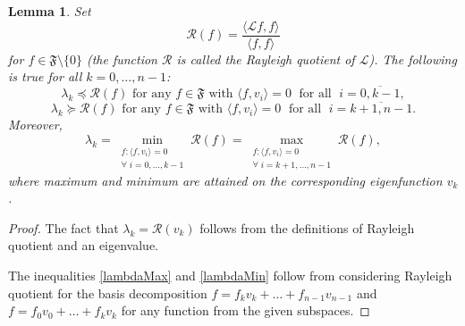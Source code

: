 \documentclass[a4paper,12pt]{amsart}
\newtheorem{lemma}{Lemma}
\theoremstyle{definition}
\begin{document}
\begin{lemma}\label{Rq}
Set 
\begin{equation*}
\mathcal R(f)=\dfrac{\langle\mathcal L f,f\rangle}{\langle f,f\rangle}
\end{equation*}
for $f\in \mathfrak F\setminus\{0\}$ (the function $\mathcal R$ is called the \emph{Rayleigh quotient} of $\mathcal L$). The following is true for all $k=0,\dots,n-1$:
\begin{equation}\label{lambdaMax}
\lambda_k\preceq \mathcal R(f) \mbox{ for any } f\in\mathfrak F\mbox{ with }\langle f,v_i\rangle=0\; \mbox{ for all }\; i=\overline{0,k-1},
\end{equation}
 \begin{equation}\label{lambdaMin}
\lambda_k \succeq \mathcal R(f) \mbox{ for any }{f \in\mathfrak F\mbox{ with }\langle f,v_i\rangle=0\; \mbox{ for all }\; i=\overline{k+1,n-1}}.
\end{equation}
Moreover,
 \begin{equation}
\lambda_k =\min_{\substack{f:\langle f,v_i\rangle=0\\ \forall\; i=0,\dots,k-1}}\mathcal R(f) =\max_{\substack{f:\langle f,v_i\rangle=0\\ \forall\; i=k+1,\dots,n-1}}\mathcal R(f),
\end{equation}
where maximum and minimum are attained on the corresponding eigenfunction $v_k$.
\end{lemma}
\begin{proof}
The fact that $\lambda_k=\mathcal R(v_k)$ follows from the definitions of Rayleigh quotient and an eigenvalue.

The inequalities \eqref{lambdaMax} and \eqref{lambdaMin} follow from considering
Rayleigh quotient for the basis decomposition  $f=f_{k}v_{k}+\dots+f_{n-1}v_{n-1}$ and $f=f_0v_0+\dots+f_{k}v_{k}$ for any function from the given subspaces.


\end{proof}
\end{document}

